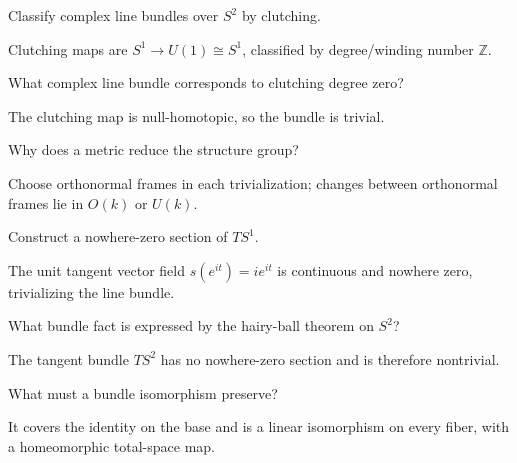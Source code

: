 \begin{problem}\label{prob:viii30-10}
Classify complex line bundles over \(S^2\) by clutching.
\end{problem}
\begin{solution}
Clutching maps are \(S^1\to U(1)\cong S^1\), classified by degree/winding number \(\mathbb Z\).
\end{solution}

\begin{problem}\label{prob:viii30-11}
What complex line bundle corresponds to clutching degree zero?
\end{problem}
\begin{solution}
The clutching map is null-homotopic, so the bundle is trivial.
\end{solution}

\begin{problem}\label{prob:viii30-12}
Why does a metric reduce the structure group?
\end{problem}
\begin{solution}
Choose orthonormal frames in each trivialization; changes between orthonormal frames lie in \(O(k)\) or \(U(k)\).
\end{solution}

\begin{problem}\label{prob:viii30-13}
Construct a nowhere-zero section of \(TS^1\).
\end{problem}
\begin{solution}
The unit tangent vector field \(s(e^{it})=ie^{it}\) is continuous and nowhere zero, trivializing the line bundle.
\end{solution}

\begin{problem}\label{prob:viii30-14}
What bundle fact is expressed by the hairy-ball theorem on \(S^2\)?
\end{problem}
\begin{solution}
The tangent bundle \(TS^2\) has no nowhere-zero section and is therefore nontrivial.
\end{solution}

\begin{problem}\label{prob:viii30-15}
What must a bundle isomorphism preserve?
\end{problem}
\begin{solution}
It covers the identity on the base and is a linear isomorphism on every fiber, with a homeomorphic total-space map.
\end{solution}

